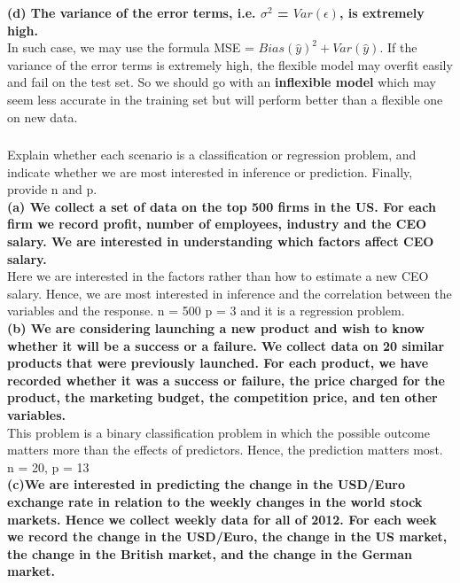 \documentclass{article}
\begin{document}
\textbf{(d) The variance of the error terms, i.e. $\sigma^2$ = $Var(\epsilon)$, is extremely high.}\\

In such case, we may use the formula MSE = $Bias(\hat{y})^2 + Var(\hat{y})$. If the variance of the error terms is extremely high, the flexible model may overfit easily and fail on the test set. So we should go with an \textbf{inflexible model} which may seem less accurate in the training set but will perform better than a flexible one on new data.\\

\subsubsection{} Explain whether each scenario is a classification or regression problem, and indicate whether we are most interested in inference or prediction. Finally, provide n and p.\\

\textbf{(a) We collect a set of data on the top 500 firms in the US. For each firm we record profit, number of employees, industry and the CEO salary. We are interested in understanding which factors affect CEO salary.}\\

Here we are interested in the factors rather than how to estimate a new CEO salary. Hence, we are most interested in inference and the correlation between the variables and the response. n = 500 p = 3 and it is a regression problem. \\

\textbf{(b) We are considering launching a new product and wish to know whether it will be a success or a failure. We collect data on 20
similar products that were previously launched. For each product, we have recorded whether it was a success or failure, the price charged for the product, the marketing budget, the competition price, and ten other variables.}\\

This problem is a binary classification problem in which the possible outcome matters more than the effects of predictors. Hence, the prediction matters most. n = 20, p = 13 \\

\textbf{(c)We are interested in predicting the change in the USD/Euro exchange rate in relation to the weekly changes in the world stock markets. Hence we collect weekly data for all of 2012. For each week we record the change in the USD/Euro, the change in the US market, the change in the British market, and the change in the German market.} \\
\end{document}
